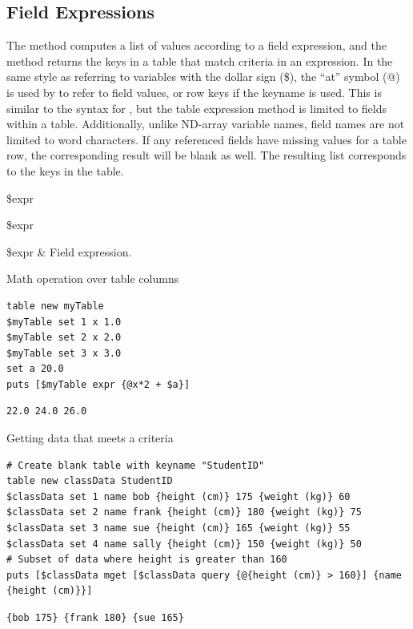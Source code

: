 \subsection{Field Expressions}
The method  computes a list of values according to a field expression, and the method  returns the keys in a table that match criteria in an expression.
In the same style as referring to variables with the dollar sign (\$), the ``at'' symbol (@) is used by  to refer to field values, or row keys if the keyname is used. 
This is similar to the syntax for , but the table expression method is limited to fields within a table.
Additionally, unlike ND-array variable names, field names are not limited to word characters. 
If any referenced fields have missing values for a table row, the corresponding result will be blank as well. 
The resulting list corresponds to the keys in the table.
\begin{syntax}
 \$expr
\end{syntax}
\begin{syntax}
 \$expr
\end{syntax}
\begin{args}
\$expr & Field expression.
\end{args}
\begin{example}{Math operation over table columns}
\begin{lstlisting}
table new myTable
$myTable set 1 x 1.0 
$myTable set 2 x 2.0
$myTable set 3 x 3.0
set a 20.0
puts [$myTable expr {@x*2 + $a}]
\end{lstlisting}
\tcblower
\begin{lstlisting}
22.0 24.0 26.0
\end{lstlisting}
\end{example}
\begin{example}{Getting data that meets a criteria}
\begin{lstlisting}
# Create blank table with keyname "StudentID"
table new classData StudentID
$classData set 1 name bob {height (cm)} 175 {weight (kg)} 60
$classData set 2 name frank {height (cm)} 180 {weight (kg)} 75
$classData set 3 name sue {height (cm)} 165 {weight (kg)} 55
$classData set 4 name sally {height (cm)} 150 {weight (kg)} 50
# Subset of data where height is greater than 160
puts [$classData mget [$classData query {@{height (cm)} > 160}] {name {height (cm)}}]
\end{lstlisting}
\tcblower
\begin{lstlisting}
{bob 175} {frank 180} {sue 165}
\end{lstlisting}
\end{example}


